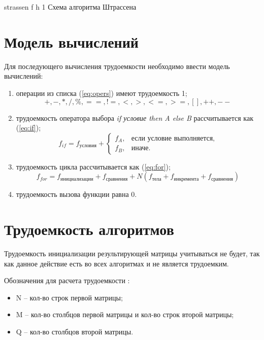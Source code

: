	{strassen} %
	{f} %
	{h} %
	{1\textwidth} %
	{Схема алгоритма Штрассена} %
\clearpage

\section{Модель вычислений}
Для последующего вычисления трудоемкости необходимо ввести модель вычислений:

\begin{enumerate}
	\item операции из списка (\ref{eq:opers}) имеют трудоемкость 1;
	\begin{equation}
		\label{eq:opers}
		+, -, *, /, \%, ==, !=, <, >, <=, >=, [], ++, {-}-
	\end{equation}
	\item трудоемкость оператора выбора \textit{if условие then A else B} рассчитывается как (\ref{eq:if});
	\begin{equation}
		\label{eq:if}
		f_{if} = f_{\text{условия}} +
		\begin{cases}
			f_A, & \text{если условие выполняется,}\\
			f_B, & \text{иначе.}
		\end{cases}
	\end{equation}
	\item трудоемкость цикла рассчитывается как (\ref{eq:for});
	\begin{equation}
		\label{eq:for}
		f_{for} = f_{\text{инициализации}} + f_{\text{сравнения}} + N(f_{\text{тела}} + f_{\text{инкремента}} + f_{\text{сравнения}})
	\end{equation}
	\item трудоемкость вызова функции равна 0.
\end{enumerate}


\section{Трудоемкость алгоритмов}

Трудоемкость инициализации результирующей матрицы учитываться не будет, так как данное действие есть во всех алгоритмах и не является трудоемким.

Обозначения для расчета трудоемкости :
\begin{itemize}
	\item N -- кол-во строк первой матрицы;
	\item M -- кол-во столбцов первой матрицы и кол-во строк второй матрицы;
	\item Q -- кол-во столбцов второй матрицы.
	
\end{itemize}


